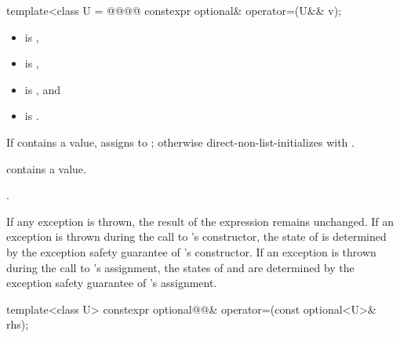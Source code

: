 %
\begin{itemdecl}
template<class U = @@@@
  constexpr optional& operator=(U&& v);
\end{itemdecl}

\begin{itemdescr}
\pnum
\constraints
\begin{itemize}
\item {} is ,
\item {} is ,
\item {} is , and
\item {} is .
\end{itemize}

\pnum
\effects
If  contains a value, assigns  to ; otherwise direct-non-list-initializes  with .

\pnum
\ensures
{} contains a value.

\pnum
\returns
{}.

\pnum
\remarks
If any exception is thrown, the result of the expression  remains unchanged. If an exception is thrown during the call to 's constructor, the state of  is determined by the exception safety guarantee of 's constructor. If an exception is thrown during the call to 's assignment, the states of  and  are determined by the exception safety guarantee of 's assignment.
\end{itemdescr}

%
\begin{itemdecl}
template<class U>
  constexpr optional@@& operator=(const optional<U>& rhs);
\end{itemdecl}

